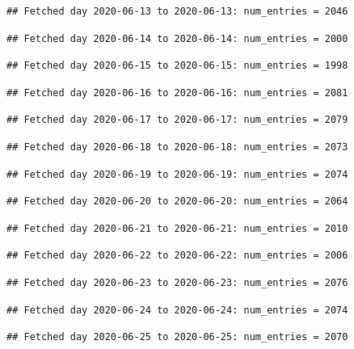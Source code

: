 \documentclass[]{article}
\begin{document}
\begin{verbatim}
## Fetched day 2020-06-13 to 2020-06-13: num_entries = 2046
\end{verbatim}

\begin{verbatim}
## Fetched day 2020-06-14 to 2020-06-14: num_entries = 2000
\end{verbatim}

\begin{verbatim}
## Fetched day 2020-06-15 to 2020-06-15: num_entries = 1998
\end{verbatim}

\begin{verbatim}
## Fetched day 2020-06-16 to 2020-06-16: num_entries = 2081
\end{verbatim}

\begin{verbatim}
## Fetched day 2020-06-17 to 2020-06-17: num_entries = 2079
\end{verbatim}

\begin{verbatim}
## Fetched day 2020-06-18 to 2020-06-18: num_entries = 2073
\end{verbatim}

\begin{verbatim}
## Fetched day 2020-06-19 to 2020-06-19: num_entries = 2074
\end{verbatim}

\begin{verbatim}
## Fetched day 2020-06-20 to 2020-06-20: num_entries = 2064
\end{verbatim}

\begin{verbatim}
## Fetched day 2020-06-21 to 2020-06-21: num_entries = 2010
\end{verbatim}

\begin{verbatim}
## Fetched day 2020-06-22 to 2020-06-22: num_entries = 2006
\end{verbatim}

\begin{verbatim}
## Fetched day 2020-06-23 to 2020-06-23: num_entries = 2076
\end{verbatim}

\begin{verbatim}
## Fetched day 2020-06-24 to 2020-06-24: num_entries = 2074
\end{verbatim}

\begin{verbatim}
## Fetched day 2020-06-25 to 2020-06-25: num_entries = 2070
\end{verbatim}
\end{document}
